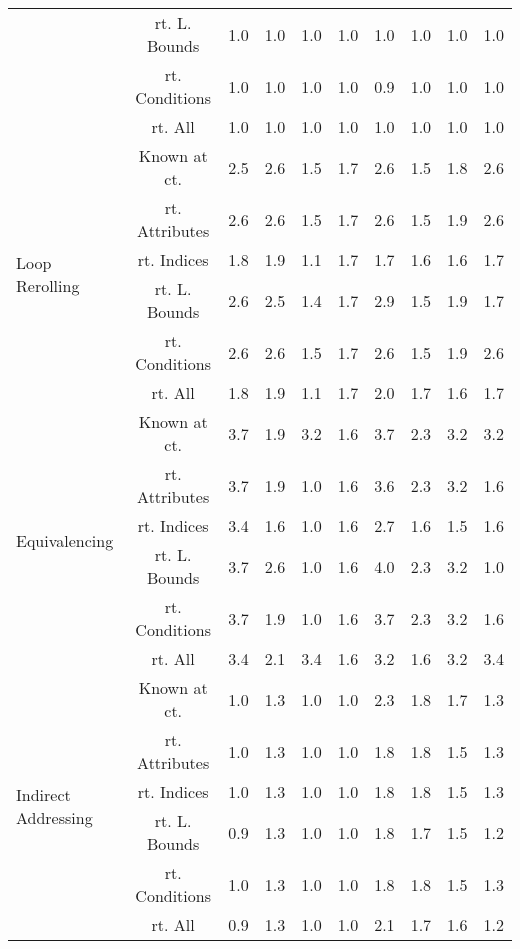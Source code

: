 \documentclass{article}
\begin{document}
\begin{longtable}{|p{2cm}||c|c|c|c|c|c|c|c|c|}
 & rt. L. Bounds & 1.0 & 1.0 & 1.0 & 1.0 & 1.0 & 1.0 & 1.0 & 1.0\\ \cline{2-10}
 & rt. Conditions & 1.0 & 1.0 & 1.0 & 1.0 & 0.9 & 1.0 & 1.0 & 1.0\\ \cline{2-10}
 & rt. All & 1.0 & 1.0 & 1.0 & 1.0 & 1.0 & 1.0 & 1.0 & 1.0\\ \cline{2-10}
\hline
\multirow{6}{*}{ \parbox{2cm}{Loop Rerolling}} & Known at ct. & 2.5 & 2.6 & 1.5 & 1.7 & 2.6 & 1.5 & 1.8 & 2.6\\ \cline{2-10}
 & rt. Attributes & 2.6 & 2.6 & 1.5 & 1.7 & 2.6 & 1.5 & 1.9 & 2.6\\ \cline{2-10}
 & rt. Indices & 1.8 & 1.9 & 1.1 & 1.7 & 1.7 & 1.6 & 1.6 & 1.7\\ \cline{2-10}
 & rt. L. Bounds & 2.6 & 2.5 & 1.4 & 1.7 & 2.9 & 1.5 & 1.9 & 1.7\\ \cline{2-10}
 & rt. Conditions & 2.6 & 2.6 & 1.5 & 1.7 & 2.6 & 1.5 & 1.9 & 2.6\\ \cline{2-10}
 & rt. All & 1.8 & 1.9 & 1.1 & 1.7 & 2.0 & 1.7 & 1.6 & 1.7\\ \cline{2-10}
\hline
\multirow{6}{*}{ \parbox{2cm}{Equivalencing}} & Known at ct. & 3.7 & 1.9 & 3.2 & 1.6 & 3.7 & 2.3 & 3.2 & 3.2\\ \cline{2-10}
 & rt. Attributes & 3.7 & 1.9 & 1.0 & 1.6 & 3.6 & 2.3 & 3.2 & 1.6\\ \cline{2-10}
 & rt. Indices & 3.4 & 1.6 & 1.0 & 1.6 & 2.7 & 1.6 & 1.5 & 1.6\\ \cline{2-10}
 & rt. L. Bounds & 3.7 & 2.6 & 1.0 & 1.6 & 4.0 & 2.3 & 3.2 & 1.0\\ \cline{2-10}
 & rt. Conditions & 3.7 & 1.9 & 1.0 & 1.6 & 3.7 & 2.3 & 3.2 & 1.6\\ \cline{2-10}
 & rt. All & 3.4 & 2.1 & 3.4 & 1.6 & 3.2 & 1.6 & 3.2 & 3.4\\ \cline{2-10}
\hline
\multirow{6}{*}{ \parbox{2cm}{Indirect Addressing}} & Known at ct. & 1.0 & 1.3 & 1.0 & 1.0 & 2.3 & 1.8 & 1.7 & 1.3\\ \cline{2-10}
 & rt. Attributes & 1.0 & 1.3 & 1.0 & 1.0 & 1.8 & 1.8 & 1.5 & 1.3\\ \cline{2-10}
 & rt. Indices & 1.0 & 1.3 & 1.0 & 1.0 & 1.8 & 1.8 & 1.5 & 1.3\\ \cline{2-10}
 & rt. L. Bounds & 0.9 & 1.3 & 1.0 & 1.0 & 1.8 & 1.7 & 1.5 & 1.2\\ \cline{2-10}
 & rt. Conditions & 1.0 & 1.3 & 1.0 & 1.0 & 1.8 & 1.8 & 1.5 & 1.3\\ \cline{2-10}
 & rt. All & 0.9 & 1.3 & 1.0 & 1.0 & 2.1 & 1.7 & 1.6 & 1.2\\ \cline{2-10}
\hline
\end{longtable}
\end{document}
